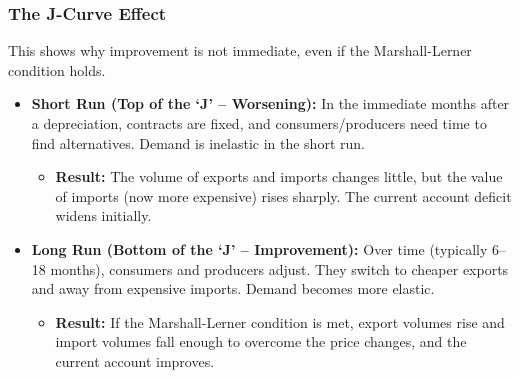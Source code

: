 \documentclass[11pt, a4paper, twoside]{book}
\begin{document}
\subsubsection{The J-Curve Effect}

This shows why improvement is not immediate, even if the Marshall-Lerner condition holds.

\begin{itemize}
  \item \textbf{Short Run (Top of the `J' -- Worsening):} In the immediate months after a depreciation, contracts are fixed, and consumers/producers need time to find alternatives. Demand is inelastic in the short run.
  \begin{itemize}
    \item \textbf{Result:} The volume of exports and imports changes little, but the value of imports (now more expensive) rises sharply. The current account deficit widens initially.
  \end{itemize}
  \item \textbf{Long Run (Bottom of the `J' -- Improvement):} Over time (typically 6--18 months), consumers and producers adjust. They switch to cheaper exports and away from expensive imports. Demand becomes more elastic.
  \begin{itemize}
    \item \textbf{Result:} If the Marshall-Lerner condition is met, export volumes rise and import volumes fall enough to overcome the price changes, and the current account improves.
  \end{itemize}
\end{itemize}
\end{document}
